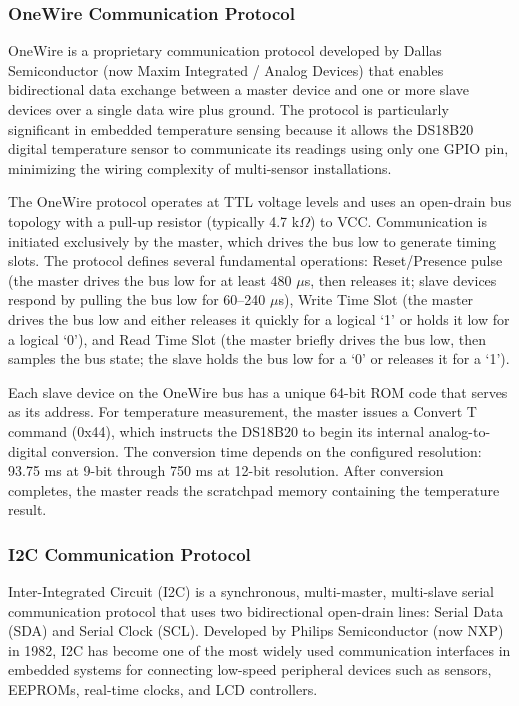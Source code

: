 \subsubsection{OneWire Communication Protocol}

OneWire is a proprietary communication protocol developed by Dallas Semiconductor (now Maxim Integrated / Analog Devices) that enables bidirectional data exchange between a master device and one or more slave devices over a single data wire plus ground. The protocol is particularly significant in embedded temperature sensing because it allows the DS18B20 digital temperature sensor to communicate its readings using only one GPIO pin, minimizing the wiring complexity of multi-sensor installations.

The OneWire protocol operates at TTL voltage levels and uses an open-drain bus topology with a pull-up resistor (typically 4.7 k$\Omega$) to VCC. Communication is initiated exclusively by the master, which drives the bus low to generate timing slots. The protocol defines several fundamental operations: Reset/Presence pulse (the master drives the bus low for at least 480 $\mu$s, then releases it; slave devices respond by pulling the bus low for 60--240 $\mu$s), Write Time Slot (the master drives the bus low and either releases it quickly for a logical `1' or holds it low for a logical `0'), and Read Time Slot (the master briefly drives the bus low, then samples the bus state; the slave holds the bus low for a `0' or releases it for a `1').

Each slave device on the OneWire bus has a unique 64-bit ROM code that serves as its address. For temperature measurement, the master issues a Convert T command (0x44), which instructs the DS18B20 to begin its internal analog-to-digital conversion. The conversion time depends on the configured resolution: 93.75 ms at 9-bit through 750 ms at 12-bit resolution. After conversion completes, the master reads the scratchpad memory containing the temperature result.

\subsubsection{I2C Communication Protocol}

Inter-Integrated Circuit (I2C) is a synchronous, multi-master, multi-slave serial communication protocol that uses two bidirectional open-drain lines: Serial Data (SDA) and Serial Clock (SCL). Developed by Philips Semiconductor (now NXP) in 1982, I2C has become one of the most widely used communication interfaces in embedded systems for connecting low-speed peripheral devices such as sensors, EEPROMs, real-time clocks, and LCD controllers.

